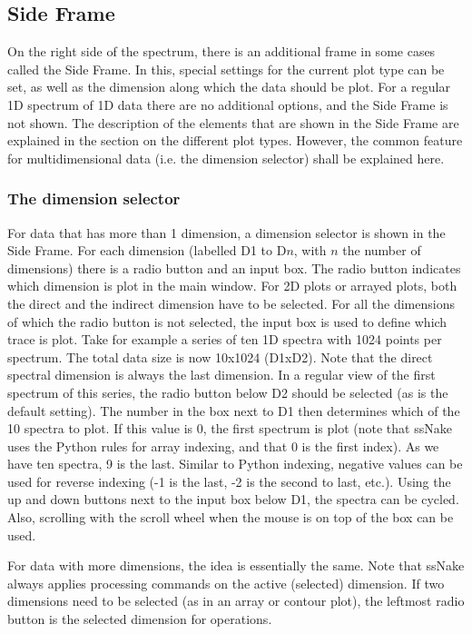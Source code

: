 \documentclass[11pt,a4paper]{article}
\begin{document}
\subsection{Side Frame}
On the right side of the spectrum, there is an additional frame in some cases called the Side Frame. In this, special settings for the current plot type can be set, as well as the dimension along which the data should be plot. For a regular 1D spectrum of 1D data there are no additional options, and the Side Frame is not shown. The description of the elements that are shown in the Side Frame are explained in the section on the different plot types. However, the common feature for multidimensional data (i.e. the dimension selector) shall be explained here.

\subsubsection*{The dimension selector}
For data that has more than 1 dimension, a dimension selector is shown in the Side Frame. For each dimension (labelled D1 to D$n$, with $n$ the number of dimensions) there is a radio button and an input box. The radio button indicates which dimension is plot in the main window. For 2D plots or arrayed plots, both the direct and the indirect dimension have to be selected. For all the dimensions of which the radio button is not selected, the input box is used to define which trace is plot. Take for example a series of ten 1D spectra with 1024 points per spectrum. The total data size is now 10x1024 (D1xD2). Note that the direct spectral dimension is always the last dimension. In a regular view of the first spectrum of this series, the radio button below D2 should be selected (as is the default setting). The number in the box next to D1 then determines which of the 10 spectra to plot. If this value is 0, the first spectrum is plot (note that ssNake uses the Python rules for array indexing, and that 0 is the first index). As we have ten spectra, 9 is the last. Similar to Python indexing, negative values can be used for reverse indexing (-1 is the last, -2 is the second to last, etc.). Using the up and down buttons next to the input box below D1, the spectra can be cycled. Also, scrolling with the scroll wheel when the mouse is on top of the box can be used.

For data with more dimensions, the idea is essentially the same. Note that ssNake always applies processing commands on the active (selected) dimension. If two dimensions need to be selected (as in an array or contour plot), the leftmost radio button is the selected dimension for operations.
\end{document}
